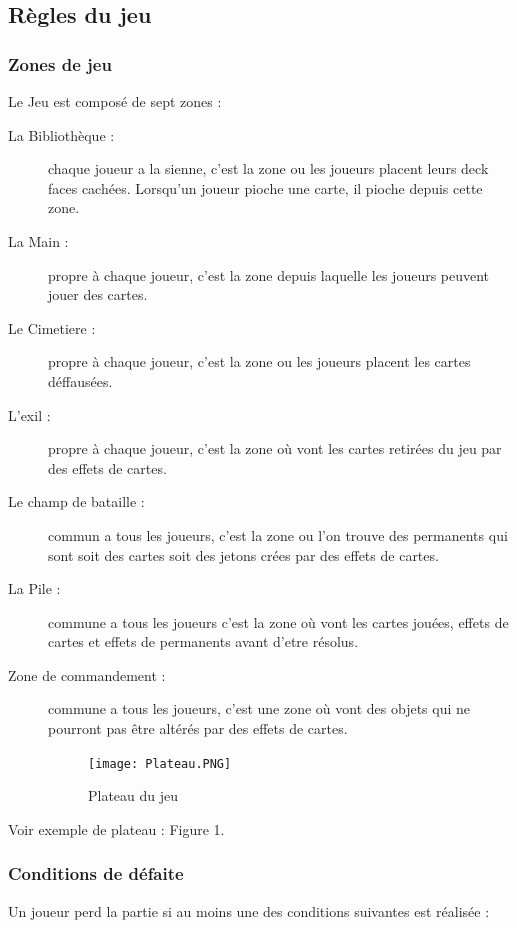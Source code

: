 \documentclass[a4paper,12pt]{article}
\begin{document}
\subsection{Règles du jeu}

\subsubsection{Zones de jeu}
Le Jeu est composé de sept zones :

\begin{description}
\item[La Bibliothèque :] chaque joueur a la sienne, c'est la zone ou les joueurs placent leurs deck faces cachées.
Lorsqu'un joueur pioche une carte, il pioche depuis cette zone.
\item[La Main :] propre à chaque joueur, c'est la zone depuis laquelle les joueurs peuvent jouer des cartes.
\item[Le Cimetiere :] propre à chaque joueur, c'est la zone ou les joueurs placent les cartes déffausées.
\item[L'exil :] propre à chaque joueur, c'est la zone où vont les cartes retirées du jeu par des effets de cartes.
\item[Le champ de bataille :] commun a tous les joueurs, c'est la zone ou l'on trouve des permanents qui sont soit des cartes soit des jetons crées par des effets de cartes.
\item[La Pile :] commune a tous les joueurs c'est la zone où vont les cartes jouées, effets de cartes et effets de permanents avant d'etre résolus.
\item[Zone de commandement :] commune a tous les joueurs, c'est une zone où vont des objets qui ne pourront pas être altérés par des effets de cartes.



\begin{figure}[h]
\begin{center}
\texttt{[image: Plateau.PNG]}
\caption{\label{Plateau-du-jeu}Plateau du jeu}
\end{center}
\end{figure}



\end{description}

Voir exemple de plateau : Figure 1.

\subsubsection{Conditions de défaite}
Un joueur perd la partie si au moins une des conditions suivantes est réalisée : 
\end{document}
